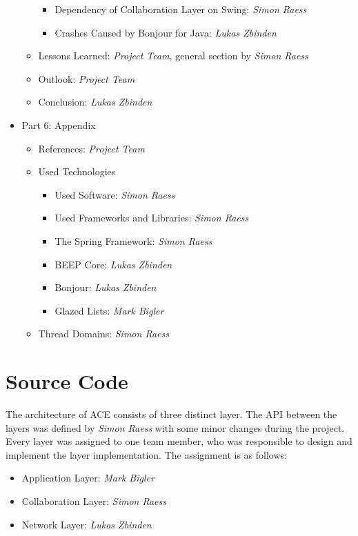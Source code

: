 \begin{itemize}
\begin{itemize}
\begin{itemize}
   \item Dependency of Collaboration Layer on Swing: \emph{Simon Raess}
   \item Crashes Caused by Bonjour for Java: \emph{Lukas Zbinden}
  \end{itemize}
  \item Lessons Learned: \emph{Project Team}, general section by \emph{Simon Raess}
  \item Outlook: \emph{Project Team}
  \item Conclusion: \emph{Lukas Zbinden}
 \end{itemize}
 \item Part 6: Appendix
 \begin{itemize}
  \item References: \emph{Project Team}
  \item Used Technologies
  \begin{itemize}
   \item Used Software: \emph{Simon Raess}
   \item Used Frameworks and Libraries: \emph{Simon Raess}
   \item The Spring Framework: \emph{Simon Raess}
   \item BEEP Core: \emph{Lukas Zbinden}
   \item Bonjour: \emph{Lukas Zbinden}
   \item Glazed Lists: \emph{Mark Bigler}
  \end{itemize}
  \item Thread Domains: \emph{Simon Raess}
 \end{itemize}
\end{itemize}



\section{Source Code}
The architecture of ACE consists of three distinct layer. The 
API between the layers was defined by \emph{Simon Raess} with some 
minor changes during the project. Every layer
was assigned to one team member, who was responsible to design and implement
the layer implementation. The assignment is as follows:

\begin{itemize}
 \item Application Layer: \emph{Mark Bigler}
 \item Collaboration Layer: \emph{Simon Raess}
 \item Network Layer: \emph{Lukas Zbinden}
\end{itemize}

